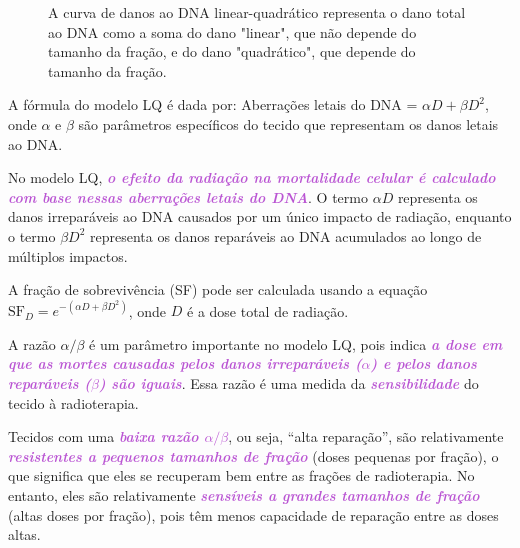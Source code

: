 \documentclass[11pt,a4paper]{article}
\begin{document}
	\begin{figure}[h]
		\centering
		\caption{A curva de danos ao DNA linear-quadrático representa o dano total ao DNA como a soma do dano "linear", que não depende do tamanho da fração, e do dano "quadrático", que depende do tamanho da fração.}
		\label{fig:modeloLinearQuadratico}
	\end{figure}

	A fórmula do modelo LQ é dada por: Aberrações letais do DNA = $\alpha D + \beta D^2$, onde $\alpha$ e $\beta$ são parâmetros específicos do tecido que representam os danos letais ao DNA.

	No modelo LQ, \textcolor{MediumOrchid}{\textbf{\textit{o efeito da radiação na mortalidade celular é calculado com base nessas aberrações letais do DNA}}}. O termo $\alpha D$ representa os danos irreparáveis ao DNA causados por um único impacto de radiação, enquanto o termo $\beta D^2$ representa os danos reparáveis ao DNA acumulados ao longo de múltiplos impactos.

	A fração de sobrevivência (SF) pode ser calculada usando a equação $\text{SF}_D = e^{-({\alpha D + \beta D^2})}$, onde $D$ é a dose total de radiação.

	A razão $\alpha/\beta$ é um parâmetro importante no modelo LQ, pois indica \textcolor{MediumOrchid}{\textbf{\textit{a dose em que as mortes causadas pelos danos irreparáveis ($\alpha$) e pelos danos reparáveis ($\beta$) são iguais}}}. Essa razão é uma medida da \textcolor{MediumOrchid}{\textbf{\textit{sensibilidade}}} do tecido à radioterapia.

	Tecidos com uma \textcolor{MediumOrchid}{\textbf{\textit{baixa razão $\alpha/\beta$}}}, ou seja, ``alta reparação'', são relativamente \textcolor{MediumOrchid}{\textbf{\textit{resistentes a pequenos tamanhos de fração}}} (doses pequenas por fração), o que significa que eles se recuperam bem entre as frações de radioterapia. No entanto, eles são relativamente \textcolor{MediumOrchid}{\textbf{\textit{sensíveis a grandes tamanhos de fração}}} (altas doses por fração), pois têm menos capacidade de reparação entre as doses altas.
\end{document}
